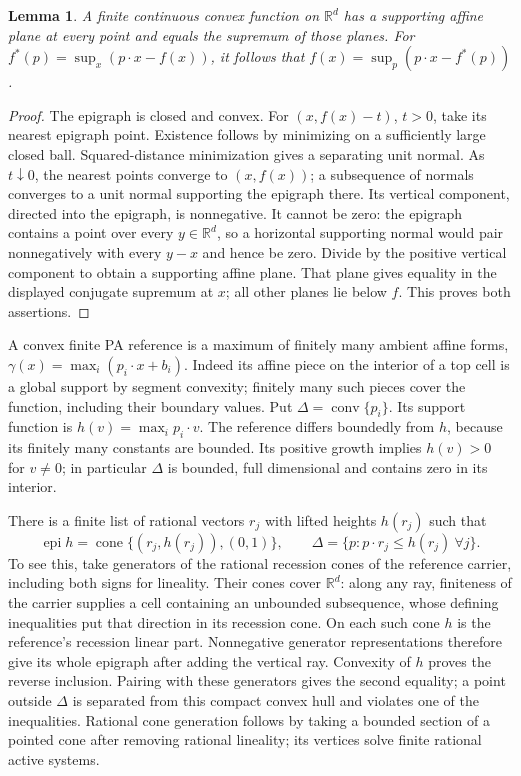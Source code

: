 \documentclass[11pt]{article}
\newtheorem{lemma}[theorem]{Lemma}
\newcommand{\R}{\mathbb R}
\begin{document}
\begin{lemma}\label{support}
A finite continuous convex function on $\R^d$ has a supporting affine
plane at every point and equals the supremum of those planes.
For $f^*(p)=\sup_x(p\cdot x-f(x))$, it follows that
$f(x)=\sup_p(p\cdot x-f^*(p))$.
\end{lemma}
\begin{proof}
The epigraph is closed and convex. For $(x,f(x)-t)$, $t>0$, take its
nearest epigraph point. Existence follows by minimizing on a sufficiently
large closed ball. Squared-distance minimization gives a separating unit
normal. As $t\downarrow0$, the nearest points converge to $(x,f(x))$;
a subsequence of normals converges to a unit normal supporting the
epigraph there. Its vertical component, directed into the epigraph, is
nonnegative. It cannot be zero: the epigraph contains a point over
every $y\in\R^d$, so a horizontal supporting normal would pair
nonnegatively with every $y-x$ and hence be zero. Divide by the positive
vertical component to obtain a supporting affine plane. That plane
gives equality in the displayed conjugate supremum at $x$; all other
planes lie below $f$. This proves both assertions.
\end{proof}

A convex finite PA reference is a maximum of finitely many ambient
affine forms, $\gamma(x)=\max_i(p_i\cdot x+b_i)$. Indeed its affine
piece on the interior of a top cell is a global support by segment
convexity; finitely many such pieces cover the function, including
their boundary values. Put $\Delta=\operatorname{conv}\{p_i\}$.
Its support function is $h(v)=\max_i p_i\cdot v$.
The reference differs boundedly from $h$, because its finitely many
constants are bounded. Its positive growth implies $h(v)>0$ for
$v\ne0$; in particular $\Delta$ is bounded, full dimensional and
contains zero in its interior.

There is a finite list of rational vectors $r_j$ with lifted heights
$h(r_j)$ such that
\begin{equation}\label{recession}
 \operatorname{epi}h=\operatorname{cone}\{(r_j,h(r_j)),(0,1)\},
 \qquad \Delta=\{p:p\cdot r_j\leq h(r_j)\ \forall j\}.
\end{equation}
To see this, take generators of the rational recession cones of the
reference carrier, including both signs for lineality. Their cones
cover $\R^d$: along any ray, finiteness of the carrier supplies a
cell containing an unbounded subsequence, whose defining inequalities
put that direction in its recession cone. On each such cone $h$ is
the reference's recession linear part. Nonnegative generator
representations therefore give its whole epigraph after adding the
vertical ray. Convexity of $h$ proves the reverse inclusion. Pairing
with these generators gives the second equality; a point outside
$\Delta$ is separated from this compact convex hull and violates one
of the inequalities. Rational cone generation follows by taking a
bounded section of a pointed cone after removing rational lineality;
its vertices solve finite rational active systems.
\end{document}

